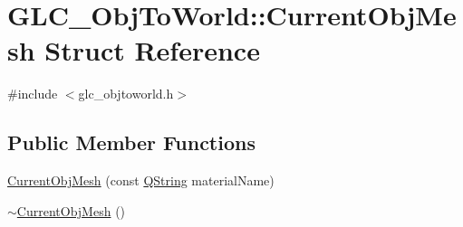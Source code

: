 \hypertarget{struct_g_l_c___obj_to_world_1_1_current_obj_mesh}{\section{G\-L\-C\-\_\-\-Obj\-To\-World\-:\-:Current\-Obj\-Mesh Struct Reference}
\label{struct_g_l_c___obj_to_world_1_1_current_obj_mesh}
}


{\ttfamily \#include $<$glc\-\_\-objtoworld.\-h$>$}

\subsection*{Public Member Functions}
\begin{DoxyCompactItemize}
\item 
\hyperlink{struct_g_l_c___obj_to_world_1_1_current_obj_mesh_ab31ea5202abeec9afcbd8a1de24d7115}{Current\-Obj\-Mesh} (const \hyperlink{group___u_a_v_objects_plugin_gab9d252f49c333c94a72f97ce3105a32d}{Q\-String} material\-Name)
\item 
\hyperlink{struct_g_l_c___obj_to_world_1_1_current_obj_mesh_a290a7a11d7d6c9c5b2e5dee05a75f205}{$\sim$\-Current\-Obj\-Mesh} ()
\end{DoxyCompactItemize}
